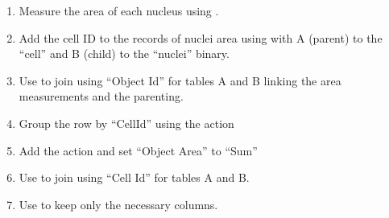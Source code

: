 \begin{enumerate}

    \item Measure the area of each nucleus using .
    
    \item Add the cell ID to the records of nuclei area using  with A (parent) to the ``cell'' and B (child) to the ``nuclei'' binary. 
    
    \item Use  to join using ``Object Id'' for tables A and B linking the area measurements and the parenting.
    
    \item Group the row by ``CellId'' using the action  
    
    \item Add the action  and set ``Object Area'' to ``Sum'' 
    
    \item Use  to join using ``Cell Id'' for tables A and B.
    
    \item Use  to keep only the necessary columns.

\end{enumerate}

